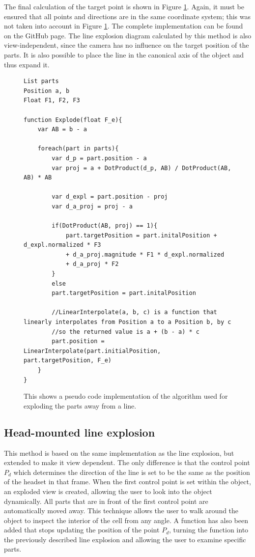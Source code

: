 The final calculation of the target point is shown in Figure \ref{fig:LineexplosionCode}.
Again, it must be ensured that all points and directions are in the same coordinate system; this was not taken into account in Figure \ref{fig:LineexplosionCode}. The complete implementation can be found on the GitHub page. %
The line explosion diagram calculated by this method is also view-independent, since the camera has no influence on the target position of the parts.  
It is also possible to place the line in the canonical axis of the object and thus expand it.  
\begin{figure}[ht]
	\begin{lstlisting}
List parts
Position a, b
Float F1, F2, F3

function Explode(float F_e){
	var AB = b - a
	
	foreach(part in parts){
		var d_p = part.position - a
		var proj = a + DotProduct(d_p, AB) / DotProduct(AB, AB) * AB
		
		var d_expl = part.position - proj
		var d_a_proj = proj - a
		
		if(DotProduct(AB, proj) == 1){
			part.targetPosition = part.initalPosition + d_expl.normalized * F3
			+ d_a_proj.magnitude * F1 * d_expl.normalized
			+ d_a_proj * F2
		}
		else
		part.targetPosition = part.initalPosition
		
		//LinearInterpolate(a, b, c) is a function that linearly interpolates from Position a to a Position b, by c
		//so the returned value is a + (b - a) * c
		part.position = LinearInterpolate(part.initialPosition, part.targetPosition, F_e)
	}
}
	\end{lstlisting}
	\caption{This shows a pseudo code implementation of the algorithm used for exploding the parts away from a line.}
	\label{fig:LineexplosionCode}
\end{figure}
\subsection{Head-mounted line explosion}
This method is based on the same implementation as the line explosion, but extended to make it view dependent. 
The only difference is that the control point $P_d$ which determines the direction of the line is set to be the same as the position of the headset in that frame. 
When the first control point is set within the object, an exploded view is created, allowing the user to look into the object dynamically. 
All parts that are in front of the first control point are automatically moved away. 
This technique allows the user to walk around the object to inspect the interior of the cell from any angle.
A function has also been added that stops updating the position of the point $P_d$, turning the function into the previously described line explosion and allowing the user to examine specific parts. 

